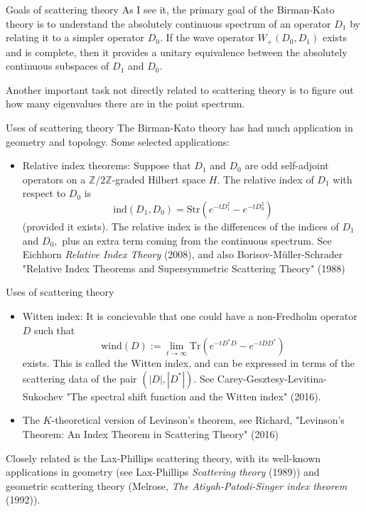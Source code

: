 \documentclass{beamer}
\numberwithin{equation}{section}
\theoremstyle{plain}
\theoremstyle{plain}
\theoremstyle{definition}
\theoremstyle{plain}
\theoremstyle{plain}
\theoremstyle{definition}
\newcommand{\Itgr}{\mathbb{Z}}
\newcommand{\Tr}{\mathrm{Tr}}
\begin{document}
\begin{frame}{Goals of scattering theory}
  As I see it, the primary goal of the Birman-Kato theory is to understand the absolutely continuous spectrum of an operator $D_1$ by relating it to a simpler operator $D_0.$
  If the wave operator $W_{+}(D_0,D_1)$ exists and is complete, then it provides a unitary equivalence between the absolutely continuous subspaces of $D_1$ and $D_0.$

  Another important task not directly related to scattering theory is to figure out how many eigenvalues there are in the point spectrum.
\end{frame}



\begin{frame}{Uses of scattering theory}
The Birman-Kato theory has had much application in geometry and topology. Some selected applications: \pause
\begin{itemize}
\item{} Relative index theorems: Suppose that $D_1$ and $D_0$ are odd self-adjoint operators on a $\Itgr/2\Itgr$-graded Hilbert space $H.$ The relative index of $D_1$ with respect to $D_0$ is
\[
\mathrm{ind}(D_1,D_0) = \mathrm{Str}(e^{-tD_1^2}-e^{-tD_0^2})
\]
(provided it exists). The relative index is the differences of the indices of $D_1$ and $D_0,$ plus an extra term coming from the continuous spectrum. See Eichhorn \emph{Relative Index Theory} (2008), and also Borisov-M\"uller-Schrader "Relative Index Theorems and Supersymmetric Scattering Theory" (1988)
\end{itemize}
\end{frame}


\begin{frame}{Uses of scattering theory}
\begin{itemize}
\item{} Witten index: It is concievable that one could have a non-Fredholm operator $D$ such that
\[
\mathrm{wind}(D) := \lim_{t\to\infty}\Tr(e^{-tD^*D}-e^{-tDD^*})
\]
exists. This is called the Witten index, and can be expressed in terms of the scattering data of the pair $(|D|,|D^*|).$ See Carey-Gesztesy-Levitina-Sukochev "The spectral shift function and the Witten index" (2016).\pause
\item{} The $K$-theoretical version of Levinson's theorem, see Richard, "Levinson’s Theorem: An Index Theorem in Scattering Theory" (2016)\pause
\end{itemize}
Closely related is the Lax-Phillips scattering theory, with its well-known applications in geometry (see Lax-Phillips \emph{Scattering theory} (1989)) and geometric scattering theory (Melrose, \emph{The Atiyah-Patodi-Singer index theorem} (1992)).
\end{frame}
\end{document}
